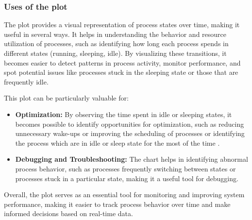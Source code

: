 \documentclass[12pt]{article}
\begin{document}
\subsubsection{Uses of the plot}
The plot provides a visual representation of process states over time, making it useful in several ways. It helps in understanding the behavior and resource utilization of processes, such as identifying how long each process spends in different states (running, sleeping, idle). By visualizing these transitions, it becomes easier to detect patterns in process activity, monitor performance, and spot potential issues like processes stuck in the sleeping state or those that are frequently idle. 

This plot can be particularly valuable for:
\begin{itemize}
    \item \textbf{Optimization:} By observing the time spent in idle or sleeping states, it becomes possible to identify opportunities for optimization, such as reducing unnecessary wake-ups or improving the scheduling of processes or identifying the process which are in idle or sleep state for the most of the time .
    \item \textbf{Debugging and Troubleshooting:} The chart helps in identifying abnormal process behavior, such as processes frequently switching between states or processes stuck in a particular state, making it a useful tool for debugging.
\end{itemize}
Overall, the plot serves as an essential tool for monitoring and improving system performance, making it easier to track process behavior over time and make informed decisions based on real-time data.
\end{document}
